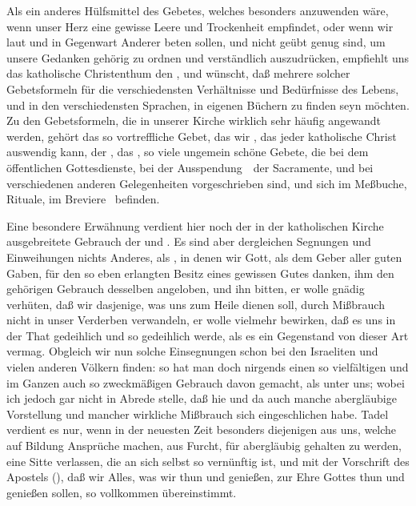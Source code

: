 \begin{aufza}
\item Als ein anderes Hülfsmittel des Gebetes, welches besonders anzuwenden wäre, wenn unser Herz eine gewisse Leere und Trockenheit empfindet, oder wenn wir laut und in Gegenwart Anderer beten sollen, und nicht geübt genug sind, um unsere Gedanken gehörig zu ordnen und verständlich auszudrücken, empfiehlt uns das katholische Christenthum den , und wünscht, daß mehrere solcher Gebetsformeln für die verschiedensten Verhältnisse und Bedürfnisse des Lebens, und in den verschiedensten Sprachen, in eigenen Büchern  zu finden seyn möchten. Zu den Gebetsformeln, die in unserer Kirche wirklich sehr häufig angewandt werden, gehört das so vortreffliche Gebet, das wir , das jeder katholische Christ auswendig kann, der , das , so viele ungemein schöne Gebete, die bei dem öffentlichen Gottesdienste, bei der Ausspendung~\ der Sacramente, und bei verschiedenen anderen Gelegenheiten vorgeschrieben sind, und sich im Meßbuche, Rituale, im Breviere \uaO\ befinden.
\item Eine besondere Erwähnung verdient hier noch der in der katholischen Kirche ausgebreitete Gebrauch der  und . Es sind aber dergleichen Segnungen und Einweihungen nichts Anderes, als , in denen wir Gott, als dem Geber aller guten Gaben, für den so eben erlangten Besitz eines gewissen Gutes danken, ihm den gehörigen Gebrauch desselben angeloben, und ihn bitten, er wolle gnädig verhüten, daß wir dasjenige, was uns zum Heile dienen soll, durch Mißbrauch nicht in unser Verderben verwandeln, er wolle vielmehr bewirken, daß es uns in der That gedeihlich und so gedeihlich werde, als es ein Gegenstand von dieser Art vermag. Obgleich wir nun solche Einsegnungen schon bei den Israeliten und vielen anderen Völkern finden: so hat man doch nirgends einen so vielfältigen und im Ganzen auch so zweckmäßigen Gebrauch davon gemacht, als unter uns; wobei ich jedoch gar nicht in Abrede stelle, daß hie und da auch manche abergläubige Vorstellung und mancher wirkliche Mißbrauch sich eingeschlichen habe. Tadel verdient es nur, wenn in der neuesten Zeit besonders diejenigen aus uns, welche auf Bildung Ansprüche machen, aus Furcht, für abergläubig gehalten zu werden, eine Sitte verlassen, die an sich selbst so vernünftig ist, und mit der Vorschrift des Apostels (), daß wir Alles, was wir thun und genießen, zur Ehre Gottes thun und genießen sollen, so vollkommen übereinstimmt.

\end{aufza}
